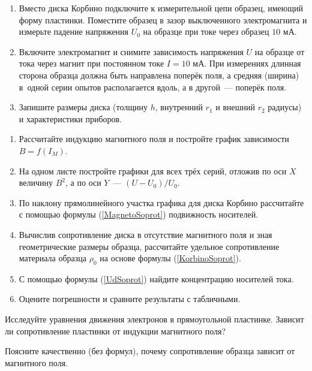 \begin{lab:task}
\begin{enumerate}
\item{ Вместо диска Корбино подключите к измерительной цепи образец, имеющий форму пластинки. Поместите образец в зазор выключенного электромагнита и измерьте падение напряжения $U_0$ на образце при токе через образец $10$ мА.}

\item{ Включите электромагнит и снимите зависимость напряжения $U$ на образце от тока через магнит при постоянном токе $I=10$ мА. При измерениях длинная сторона образца должна быть направлена поперёк поля, а средняя (ширина) в~одной серии опытов располагается вдоль, а в другой~--- поперёк поля.}

\item{ Запишите размеры диска (толщину $h$, внутренний $r_1$  и внешний $r_2$ радиусы) и характеристики приборов.}
\end{enumerate}

\begin{enumerate}

\item { Рассчитайте индукцию магнитного поля и постройте график зависимости $B=f(I_{M})$.}

\item { На одном листе постройте графики для всех трёх серий, отложив по оси $X$ величину $B^2$, а по оси $Y$~--- $(U-U_0)/U_0$.}

\item { По наклону прямолинейного участка графика для диска Корбино рассчитайте с помощью формулы (\ref{MagnetoSoprot}) подвижность носителей.}

\item { Вычислив сопротивление диска в отсутствие магнитного поля и зная геометрические размеры образца, рассчитайте удельное сопротивление материала образца $\rho_0$ на основе формулы (\ref{KorbinoSoprot}).}

\item {С помощью формулы (\ref{UdSoprot}) найдите концентрацию носителей тока.}

\item { Оцените погрешности и сравните результаты с табличными.}
\end{enumerate}
\end{lab:task}

\begin{lab:questions}

\item{ Исследуйте уравнения движения электронов в прямоугольной пластинке. Зависит ли сопротивление пластинки от индукции магнитного поля?}

\item{ Поясните качественно (без формул), почему сопротивление образца зависит от магнитного поля.}
\end{lab:questions}

